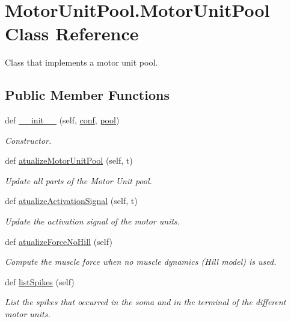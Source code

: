 \hypertarget{class_motor_unit_pool_1_1_motor_unit_pool}{}\section{Motor\+Unit\+Pool.\+Motor\+Unit\+Pool Class Reference}
\label{class_motor_unit_pool_1_1_motor_unit_pool}


Class that implements a motor unit pool.  


\subsection*{Public Member Functions}
\begin{DoxyCompactItemize}
\item 
def \hyperlink{class_motor_unit_pool_1_1_motor_unit_pool_a79dc49385a2a1c707766fd355f612088}{\+\_\+\+\_\+init\+\_\+\+\_\+} (self, \hyperlink{class_motor_unit_pool_1_1_motor_unit_pool_a3b2ee8f3e5500bfdc8fa731a5cb7d622}{conf}, \hyperlink{class_motor_unit_pool_1_1_motor_unit_pool_a832364dc014aa8a1b2947abfe063f626}{pool})
\begin{DoxyCompactList}\small\item\em Constructor. \end{DoxyCompactList}\item 
def \hyperlink{class_motor_unit_pool_1_1_motor_unit_pool_ae211c664df7b661288fe71c4a6e63a18}{atualize\+Motor\+Unit\+Pool} (self, t)
\begin{DoxyCompactList}\small\item\em Update all parts of the Motor Unit pool. \end{DoxyCompactList}\item 
def \hyperlink{class_motor_unit_pool_1_1_motor_unit_pool_a164393f9e070abb72b48d0a9685ba518}{atualize\+Activation\+Signal} (self, t)
\begin{DoxyCompactList}\small\item\em Update the activation signal of the motor units. \end{DoxyCompactList}\item 
def \hyperlink{class_motor_unit_pool_1_1_motor_unit_pool_a8f8b496796becc89ddb7e9e1c8a2fb9b}{atualize\+Force\+No\+Hill} (self)
\begin{DoxyCompactList}\small\item\em Compute the muscle force when no muscle dynamics (Hill model) is used. \end{DoxyCompactList}\item 
def \hyperlink{class_motor_unit_pool_1_1_motor_unit_pool_a11d81004e9bf591ac9dcce582e87b4f4}{list\+Spikes} (self)
\begin{DoxyCompactList}\small\item\em List the spikes that occurred in the soma and in the terminal of the different motor units. \end{DoxyCompactList}\end{DoxyCompactItemize}
